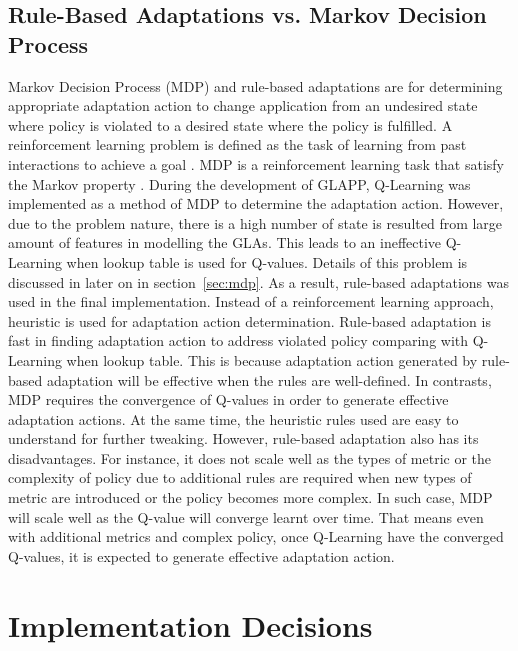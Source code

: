 \documentclass{seal_thesis}
\begin{document}
\subsection{Rule-Based Adaptations vs. Markov Decision Process}
Markov Decision Process (MDP) and rule-based adaptations are for determining appropriate adaptation action to change application from an undesired state where policy is violated to a desired state where the policy is fulfilled.
A reinforcement learning problem is defined as the task of learning from past interactions to achieve a goal .
MDP is a reinforcement learning task that satisfy the Markov property .
During the development of GLAPP, Q-Learning was implemented as a method of MDP to determine the adaptation action.
However, due to the problem nature, there is a high number of state is resulted from large amount of features in modelling the GLAs.
This leads to an ineffective Q-Learning when lookup table is used for Q-values.
Details of this problem is discussed in later on in section~\ref{sec:mdp}.
As a result, rule-based adaptations was used in the final implementation.
Instead of a reinforcement learning approach, heuristic is used for adaptation action determination.
Rule-based adaptation is fast in finding adaptation action to address violated policy comparing with Q-Learning when lookup table.
This is because adaptation action generated by rule-based adaptation will be effective when the rules are well-defined.
In contrasts, MDP requires the convergence of Q-values in order to generate effective adaptation actions.
At the same time, the heuristic rules used are easy to understand for further tweaking.
However, rule-based adaptation also has its disadvantages.
For instance, it does not scale well as the types of metric or the complexity of policy due to additional rules are required when new types of metric are introduced or the policy becomes more complex.
In such case, MDP will scale well as the Q-value will converge learnt over time. 
That means even with additional metrics and complex policy, once Q-Learning have the converged Q-values, it is expected to generate effective adaptation action.

\section{Implementation Decisions}
\end{document}
